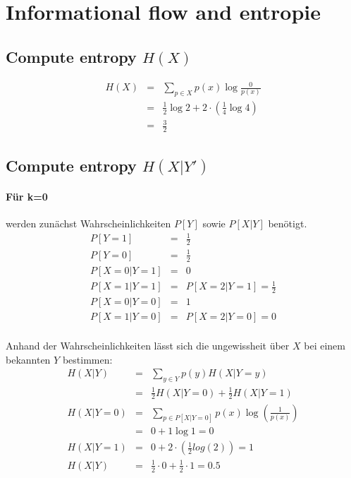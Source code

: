




\newcommand{\nr}{05}



\section{Informational flow and entropie}
\subsection{Compute entropy $H(X)$}
\begin{eqnarray}
    H(X) &=& \sum_{p \in X} p(x)\log{\frac{0}{p(x)}}  \nonumber \\
         &=& \frac{1}{2}\log{2} + 2 \cdot (\frac{1}{4}\log{4}) \nonumber \\
         &=& \frac{3}{2}
\end{eqnarray}

\subsection{Compute entropy $H(X|Y')$}
\paragraph{Für k=0} werden zunächst Wahrscheinlichkeiten $P[Y]$ sowie $P[X|Y]$
benötigt.
\begin{eqnarray}
    P[Y=1] &=& \frac{1}{2} \\
    P[Y=0] &=& \frac{1}{2} \\
    P[X=0|Y=1] &=& 0 \\
    P[X=1|Y=1] &=& P[X=2|Y=1] = \frac{1}{2} \\
    P[X=0|Y=0] &=& 1 \\
    P[X=1|Y=0] &=& P[X=2|Y=0] = 0 \\
\end{eqnarray}

Anhand der Wahrscheinlichkeiten lässt sich die ungewissheit über $X$ bei einem
bekannten $Y$ bestimmen:
\begin{eqnarray}
    H(X|Y) &=& \sum_{y \in Y} p(y) H(X|Y=y) \nonumber \\
           &=& \frac{1}{2} H(X|Y=0) + \frac{1}{2} H(X|Y=1) \\
    H(X|Y=0) &=& \sum_{p \in P[X|Y=0]}p(x)\log(\frac{1}{p(x)}) \\
             &=& 0 + 1\log{1} = 0 \\
    H(X|Y=1) &=& 0 + 2 \cdot \left( \frac{1}{2} log(2)\right) = 1 \\
    H(X|Y) &=& \frac{1}{2}\cdot 0 + \frac{1}{2}\cdot 1 = 0.5
\end{eqnarray}

